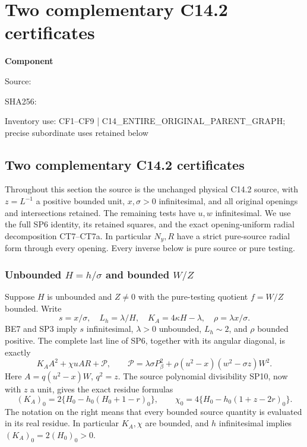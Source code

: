 \chapter{Two complementary C14.2 certificates}
\label{component:p98e371f5b846}
\noindent\textbf{Component }\par
{\small\noindent Source: \par}
{\small\noindent SHA256: \par}
{\small\noindent Inventory use: CF1--CF9 | C14\_\allowbreak{}ENTIRE\_\allowbreak{}ORIGINAL\_\allowbreak{}PARENT\_\allowbreak{}GRAPH; precise subordinate uses retained below\par}
\medskip
\section{Two complementary C14.2 certificates}
\label{p98e371f5b846:sec:r19-c142-complements}

Throughout this section the source is the unchanged physical C14.2
source, with $z=L^{-1}$ a positive bounded unit, $x,\sigma>0$
infinitesimal, and all original openings and intersections retained.
The remaining tests have $u,w$ infinitesimal. We use the full SP6
identity, its retained squares, and the exact opening-uniform radial
decomposition CT7--CT7a. In particular $N_y,R$ have a strict
pure-source radial form through every opening. Every inverse below is
pure source or pure testing.

\subsection{Unbounded $H=h/\sigma$ and bounded $W/Z$}

Suppose $H$ is unbounded and $Z\ne0$ with the pure-testing quotient
$f=W/Z$ bounded. Write
\[
 s=x/\sigma,\quad L_h=\lambda/H,\quad
 K_A=4\kappa H-\lambda,\quad \rho=\lambda x/\sigma.
\]
BE7 and SP3 imply $s$ infinitesimal, $\lambda>0$ unbounded,
$L_h\sim2$, and $\rho$ bounded positive. The complete last line of
SP6, together with its angular diagonal, is exactly
\[
 K_A A^2+\chi uAR+\mathscr P,\qquad
 \mathscr P=\lambda\sigma P_\beta^2
       +\rho(u^2-x)(w^2-\sigma z)W^2.                 \tag{CF1}
\]
Here $A=q(u^2-x)W$, $q^2=z$. The source polynomial divisibility
SP10, now with $z$ a unit, gives the exact residue formulas
\[
 (K_A)_0=2\{H_0-h_0(H_0+1-r)_0\},\qquad
 \chi_0=4\{H_0-h_0(1+z-2r)_0\}.                    \tag{CF2}
\]
The notation on the right means that every bounded source quantity
is evaluated in its real residue. In particular $K_A,\chi$ are
bounded, and $h$ infinitesimal implies $(K_A)_0=2(H_0)_0>0$.

